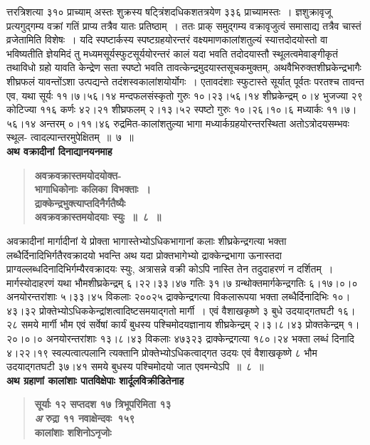\documentclass[11pt, openany]{book}
\begin{document}
\begin{sloppypar}
\noindent त्तरत्रिशत्या ३१० प्राच्याम् अस्तः शुक्रस्य षट्त्रिंशदधिकशतत्रयेण ३३६ प्राच्यामस्तः~। ज्ञशुक्रावृजू प्रत्यगुद्गम्य वक्रां गतिं प्राप्य तत्रैव यातः प्रतिष्ठाम्~। ततः प्राक् समुद्गम्य वक्रावृजुत्वं समासाद्य तत्रैव चास्तं व्रजेतामिति विशेषः~। यदि स्पष्टार्कस्य स्पष्टग्रहयोरन्तरं वक्ष्यमाणकालांशतुल्यं स्यात्तदोदयोस्तो वा भविष्यतीति ज्ञेयमिदं तु मध्यमसूर्यस्फुटसूर्ययोरन्तरं कालं यदा भवति तदोदयास्तौ स्थूलत्वमेवाङ्गीकृतं तथाविधो ग्रहो यावति केन्द्रेण सता स्पष्टो भवति तावत्केन्द्रमुदयास्तसूचकमुक्तम्, अथवैभिरुक्तशीघ्रकेन्द्रभागैः शीघ्रफलं यावन्तोंऽशा उत्पद्यन्ते तदंशस्वकालांशयोर्योगः~। एतावदंशाः स्फुटास्ते सूर्यात् पूर्वतः परतश्च तावन्त एव, यथा सूर्यः ११।७।५६।१४ मन्दफलसंस्कृतो गुरुः १०।२३।५६।१४ शीघ्रकेन्द्रम् ०।४ भुजज्या २९ कोटिज्या ११६ कर्णः ४२।२१ शीघ्रफलम् २।१३।५२ स्पष्टो गुरुः १०।२६।१०।६ मध्यार्कः ११।७।५६।१४ अन्तरम् ०।११।४६ रुद्रमित-कालांशतुल्या भागा मध्यार्कग्रहयोरन्तरस्थिता अतोऽत्रोदयसम्भवः स्थूल- त्वादल्पान्तरमुपेक्षितम्~॥~७~॥\\

{\small \textbf{अथ वक्रादीनां दिनाद्यानयनमाह\textendash }}

 \label{6.8}
\begin{quote}
{\large \textbf{{\color{purple}अवक्रवक्रास्तमयोदयोक्त-\\
भागाधिकोनाः कलिका विभक्ताः~। \\
द्राक्केन्द्रभुक्त्याप्तदिनैर्गतैष्यैः\\
अवक्रवक्रास्तमयोदयाः स्युः~॥~८~॥}}}
\end{quote}
\end{sloppypar}

\newpage

\begin{sloppypar}
अवक्रादीनां मार्गादीनां ये प्रोक्ता भागास्तेभ्योऽधिकभागानां कलाः शीघ्रकेन्द्रगत्या भक्ता लब्धैर्दिनादिभिर्गतैरवक्रादयो भवन्ति अथ यदा प्रोक्तभागेभ्यो द्राक्केन्द्रभागा ऊनास्तदा प्राग्वल्लब्धदिनादिभिर्गम्यैरवक्रादयः स्युः, अत्रासन्ने वक्री कोऽपि नास्ति तेन तदुदाहरणं न दर्शितम्~। मार्गस्योदाहरणं यथा भौमशीघ्रकेन्द्रम् ६।२२।३३।४७ गतिः ३१।७ ग्रन्थोक्तमार्गकेन्द्रगतिः ६।१७।०।० अनयोरन्तरांशाः ५।३३।४५ विकलाः २००२५ द्राक्केन्द्रगत्या विकलारूपया भक्ता लब्धैर्दिनादिभिः १०।४३।३२ प्रोक्तेभ्योऽधिककेन्द्रांशत्वादिष्टसमयाद्गतो मार्गी~। एवं वैशाखकृष्णे ३ बुधे उदयाद्गतघटी १६।२८ समये मार्गी भौम एवं सर्वेषां कार्यं बुधस्य पश्चिमोदयज्ञानाय शीघ्रकेन्द्रम् २।३।८।४३ प्रोक्तकेन्द्रम् १।२०।०।० अनयोरन्तरांशाः १३।८।४३ विकलाः ४७३२३ द्राक्केन्द्रगत्या १८०।२४ भक्ता लब्धं दिनादि ४।२२।१९ स्वल्पत्वात्पलानि त्यक्तानि प्रोक्तेभ्योऽधिकत्वाद्गत उदयः एवं वैशाखकृष्णे ८ भौम उदयाद्गतघटी ३७।४१ समये बुधस्य पश्चिमोदयो जात एवमन्येऽपि~॥~८~॥\\

{\small \textbf{अथ ग्रहाणां कालांशाः पातविक्षेपाः शार्दूलविक्रीडितेनाह\textendash }}

 \label{6.9.1}
\begin{quote}
{\large \textbf{{\color{purple}सूर्याः १२ सप्तदश १७ त्रिभूपरिमिता १३ \\
\emph{\color{white}अ} \hfill रुद्रा ११ नवाक्षेन्दवः~१५९ \\
कालांशाः शशिनोऽनृजोः}}}
\end{quote}
\end{sloppypar}
\end{document}
